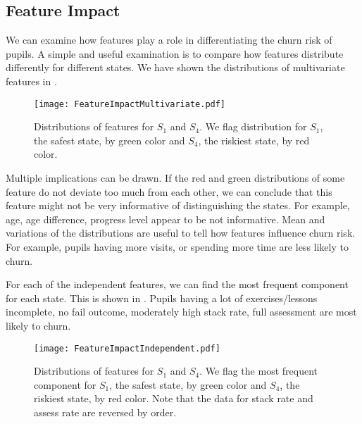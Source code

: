 \subsection{Feature Impact}

We can examine how features play a role in differentiating the churn risk of pupils. A simple and useful examination is to compare how features distribute differently for different states. We have shown the distributions of multivariate features in .

\begin{figure}[!h]
\centering
\texttt{[image: FeatureImpactMultivariate.pdf]}
\caption{Distributions of features for $S_1$ and $S_4$. We flag distribution for $S_1$, the safest state, by green color and $S_4$, the riskiest state, by red color.}
\label{fig:ftrImpMulti}
\end{figure}

Multiple implications can be drawn. If the red and green distributions of some feature do not deviate too much from each other, we can conclude that this feature might not be very informative of distinguishing the states. For example, age, age difference, progress level appear to be not informative. Mean and variations of the distributions are useful to tell how features influence churn risk. For example, pupils having more visits, or spending more time are less likely to churn. 

For each of the independent features, we can find the most frequent component for each state. This is shown in . Pupils having a lot of exercises/lessons incomplete, no fail outcome, moderately high stack rate, full assessment are most likely to churn.

\begin{figure}[!h]
\centering
\texttt{[image: FeatureImpactIndependent.pdf]}
\caption{Distributions of features for $S_1$ and $S_4$. We flag the most frequent component for $S_1$, the safest state, by green color and $S_4$, the riskiest state, by red color. Note that the data for stack rate and assess rate are reversed by order.}
\label{fig:ftrImpIndep}
\end{figure}

